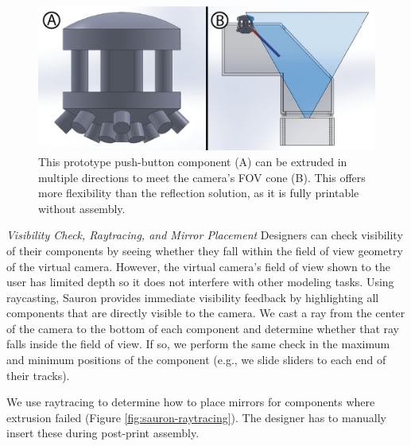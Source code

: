 \begin{figure}
\centering
\includegraphics[width=\textwidth]{figures/sauron/extrusion++.png}
\caption{This prototype push-button component (A) can be extruded in multiple directions to meet the camera's FOV cone (B). This offers more flexibility than the reflection solution, as it is fully printable without assembly.
}
\label{fig:sauron-extrusion-multi}
\end{figure}


\emph{Visibility Check, Raytracing, and Mirror Placement}
Designers can check visibility of their components by seeing whether they fall within the field of view geometry of the virtual camera. However, the virtual camera's field of view shown to the user has limited depth so it does not interfere with other modeling tasks. Using raycasting, Sauron  provides immediate visibility feedback by highlighting all components that are directly visible to the camera. We cast a ray from the center of the camera to the bottom of each component and determine whether that ray falls inside the field of view. If so, we perform the same check in the maximum and minimum positions of the component (e.g., we slide sliders to each end of their tracks). %

We use raytracing to determine how to place mirrors for components where extrusion failed (Figure \ref{fig:sauron-raytracing}). The designer has to manually insert these during post-print assembly. %

